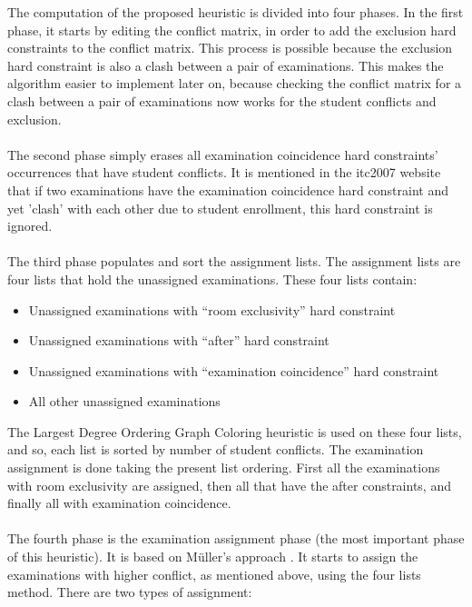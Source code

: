 The computation of the proposed heuristic is divided into four phases. In the first phase, it starts by editing the conflict matrix, in order to add the exclusion hard constraints to the conflict matrix. This process is possible because the exclusion hard constraint is also a clash between a pair of examinations. This makes the algorithm easier to implement later on, because checking the conflict matrix for a clash between a pair of examinations now works for the student conflicts and exclusion.\\
\\
The second phase simply erases all examination coincidence hard constraints' occurrences that have student conflicts. It is mentioned in the \gls{itc2007} website \cite{McCollum2007d} that if two examinations have the examination coincidence hard constraint and yet 'clash' with each other due to student enrollment, this hard constraint is ignored.\\
\\
The third phase populates and sort the assignment lists. The assignment lists are four lists that hold the unassigned examinations. These four lists contain:
\begin{itemize}
	\item Unassigned examinations with ``room exclusivity'' hard constraint
	\item Unassigned examinations with ``after'' hard constraint
	\item Unassigned examinations with ``examination coincidence'' hard constraint
	\item All other unassigned examinations
\end{itemize}
The Largest Degree Ordering Graph Coloring heuristic is used on these four lists, and so, each list is sorted by number of student conflicts. The examination assignment is done taking the present list ordering. First all the examinations with room exclusivity are assigned, then all that have the after constraints, and finally all with examination coincidence.\\
\\
The fourth phase is the examination assignment phase (the most important phase of this heuristic). It is based on M\"{u}ller's approach \cite{Mueller2009}. It starts to assign the examinations with higher conflict, as mentioned above, using the four lists method. There are two types of assignment:
\\
